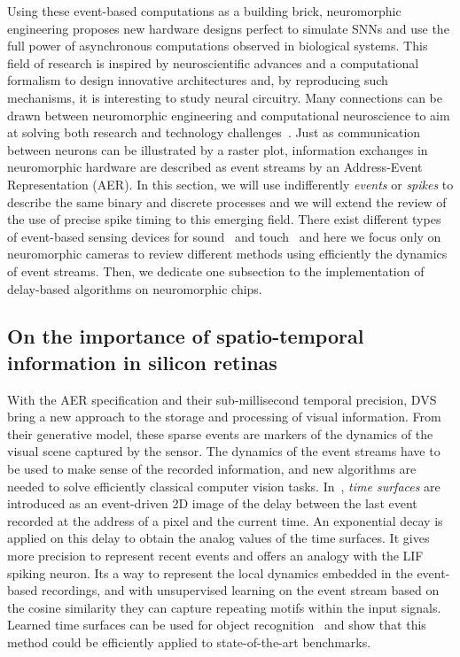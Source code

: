 \documentclass[brainsci, %
               review,submit,pdftex,moreauthors
               ]{Definitions/mdpi}
\begin{document}
Using these event-based computations as a building brick, neuromorphic engineering proposes new hardware designs perfect to simulate SNNs and use the full power of asynchronous computations observed in biological systems. This field of research is inspired by neuroscientific advances and a computational formalism to design innovative architectures and, by reproducing such mechanisms, it is interesting to study neural circuitry. Many connections can be drawn between neuromorphic engineering and computational neuroscience to aim at solving both research and technology challenges~\citep{zenke_visualizing_2021}. Just as communication between neurons can be illustrated by a raster plot, information exchanges in neuromorphic hardware are described as event streams by an Address-Event Representation (AER). In this section, we will use indifferently \textit{events} or \textit{spikes} to describe the same binary and discrete processes and we will extend the review of the use of precise spike timing to this emerging field. There exist different types of event-based sensing devices for sound~\citep{chan_aer_2007} and touch~\citep{haessig_event-based_2020} and here we focus only on neuromorphic cameras to review different methods using efficiently the dynamics of event streams. Then, we dedicate one subsection to the implementation of delay-based algorithms on neuromorphic chips.  
%
\subsection{On the importance of spatio-temporal information in silicon retinas}
%
With the AER specification and their sub-millisecond temporal precision, DVS bring a new approach to the storage and processing of visual information. From their generative model, these sparse events are markers of the dynamics of the visual scene captured by the sensor. The dynamics of the event streams have to be used to make sense of the recorded information, and new algorithms are needed to solve efficiently classical computer vision tasks. In~\citep{lagorce_hots_2017}, \textit{time surfaces} are introduced as an event-driven 2D image of the delay between the last event recorded at the address of a pixel and the current time. An exponential decay is applied on this delay to obtain the analog values of the time surfaces. It gives more precision to represent recent events and offers an analogy with the LIF spiking neuron. Its a way to represent the local dynamics embedded in the event-based recordings, and with unsupervised learning on the event stream based on the cosine similarity they can capture repeating motifs within the input signals. Learned time surfaces can be used for object recognition~\citep{lagorce_hots_2017, sironi_hats_2018, maro_event-based_2020, grimaldi_homeostatic_2021,grimaldi_robust_2022} and show that this method could be efficiently applied to state-of-the-art benchmarks.
\end{document}
